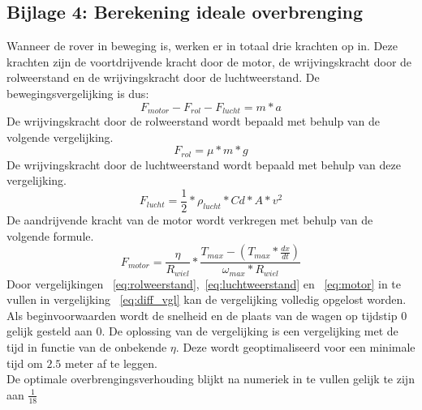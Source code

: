 \subsection{Bijlage 4: Berekening ideale overbrenging}

Wanneer de rover in beweging is, werken er in totaal drie krachten op in. Deze krachten zijn de voortdrijvende kracht door de motor, de wrijvingskracht door de rolweerstand en de wrijvingskracht door de luchtweerstand. De bewegingsvergelijking is dus:
\begin{equation} \label{eq:diff_vgl}
F_{motor}-F_{rol}-F_{lucht} = m*a
\end{equation}
De wrijvingskracht door de rolweerstand wordt bepaald met behulp van de volgende vergelijking.
\begin{equation} \label{eq:rolweerstand}
F_{rol}=\mu*m*g
\end{equation}
De wrijvingskracht door de luchtweerstand wordt bepaald met behulp van deze vergelijking.
\begin{equation} \label{eq:luchtweerstand}
F_{lucht}=\frac{1}{2} * \rho_{lucht} * Cd * A * v^2
\end{equation}
De aandrijvende kracht van de motor wordt verkregen met behulp van de volgende formule.
\begin{equation} \label{eq:motor}
F_{motor}=\frac{\eta}{R_{wiel}} * \frac{T_{max}-\left(T_{max}*\frac{dx}{dt}\right)}{\omega_{max}*R_{wiel}}
\end{equation}
Door vergelijkingen ~\ref{eq:rolweerstand},~\ref{eq:luchtweerstand} en ~\ref{eq:motor} in te vullen in vergelijking ~\ref{eq:diff_vgl} kan de vergelijking volledig opgelost worden. Als beginvoorwaarden wordt de snelheid en de plaats van de wagen op tijdstip 0 gelijk gesteld aan 0. De oplossing van de vergelijking is een vergelijking met de tijd in functie van de onbekende $\eta$. Deze wordt geoptimaliseerd voor een minimale tijd om $2.5$ meter af te leggen.\\
De optimale overbrengingsverhouding blijkt na numeriek in te vullen gelijk te zijn aan $\frac{1}{18}$